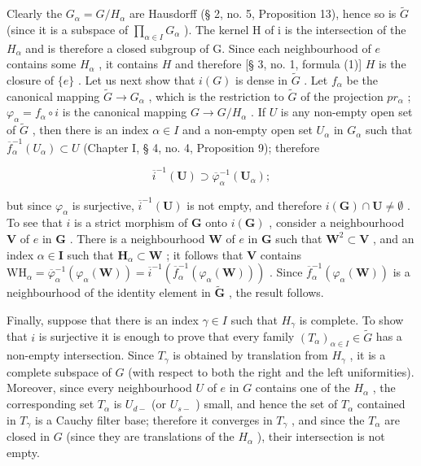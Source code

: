 Clearly the \(G_{\alpha} = G/H_{\alpha}\) are Hausdorff (§ 2, no. 5, Proposition 13), hence so is \(\tilde{G}\) (since it is a subspace of \(\prod_{\alpha \in I} G_{\alpha}\) ). The kernel H of i is the intersection of the \(H_{\alpha}\) and is therefore a closed subgroup of G. Since each neighbourhood of \(e\) contains some \(H_{\alpha}\) , it contains \(H\) and therefore {[}§ 3, no. 1, formula (1){]} \(H\) is the closure of \(\{e\}\) . Let us next show that \(i(G)\) is dense in \(\tilde{G}\) . Let \(f_{\alpha}\) be the canonical mapping \(\tilde{G} \to G_{\alpha}\) , which is the restriction to \(\tilde{G}\) of the projection \(pr_{\alpha}\) ; \(\varphi_{\alpha} = f_{\alpha} \circ i\) is the canonical mapping \(G \to G / H_{\alpha}\) . If \(U\) is any non-empty open set of \(\tilde{G}\) , then there is an index \(\alpha \in I\) and a non-empty open set \(U_{\alpha}\) in \(G_{\alpha}\) such that \(\overline{f}_{\alpha}^{-1}(U_{\alpha}) \subset U\) (Chapter I, § 4, no. 4, Proposition 9); therefore

\[
\overline {{i}} ^ {-1} (\mathbf {U}) \supset \overline {{\varphi}} _ {\alpha} ^ {-1} (\mathbf {U} _ {\alpha});
\]

but since \(\varphi_{\alpha}\) is surjective, \(\overline{i}^{-1}(\mathbf{U})\) is not empty, and therefore \(i(\mathbf{G}) \cap \mathbf{U} \neq \emptyset\) . To see that \(i\) is a strict morphism of \(\mathbf{G}\) onto \(i(\mathbf{G})\) , consider a neighbourhood \(\mathbf{V}\) of \(e\) in \(\mathbf{G}\) . There is a neighbourhood \(\mathbf{W}\) of \(e\) in \(\mathbf{G}\) such that \(\mathbf{W}^2 \subset \mathbf{V}\) , and an index \(\alpha \in \mathbf{I}\) such that \(\mathbf{H}_{\alpha} \subset \mathbf{W}\) ; it follows that \(\mathbf{V}\) contains \(\mathrm{WH}_{\alpha} = \overline{\varphi}_{\alpha}^{-1}(\varphi_{\alpha}(\mathbf{W})) = \overline{i}^{-1}(\overline{f}_{\alpha}^{-1}(\varphi_{\alpha}(\mathbf{W})))\) . Since \(\overline{f}_{\alpha}^{-1}(\varphi_{\alpha}(\mathbf{W}))\) is a neighbourhood of the identity element in \(\tilde{\mathbf{G}}\) , the result follows.

Finally, suppose that there is an index \(\gamma \in I\) such that \(H_{\gamma}\) is complete. To show that \(i\) is surjective it is enough to prove that every family \((T_{\alpha})_{\alpha \in I} \in \tilde{G}\) has a non-empty intersection. Since \(T_{\gamma}\) is obtained by translation from \(H_{\gamma}\) , it is a complete subspace of \(G\) (with respect to both the right and the left uniformities). Moreover, since every neighbourhood \(U\) of \(e\) in \(G\) contains one of the \(H_{\alpha}\) , the corresponding set \(T_{\alpha}\) is \(U_{d-}\) (or \(U_{s-}\) ) small, and hence the set of \(T_{\alpha}\) contained in \(T_{\gamma}\) is a Cauchy filter base; therefore it converges in \(T_{\gamma}\) , and since the \(T_{\alpha}\) are closed in \(G\) (since they are translations of the \(H_{\alpha}\) ), their intersection is not empty.

